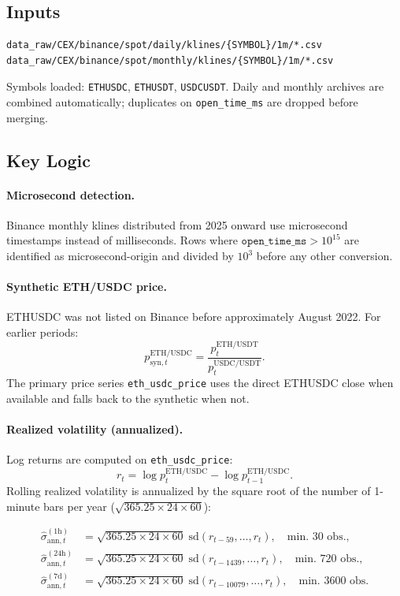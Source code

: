 \documentclass[11pt,a4paper]{article}
\begin{document}
\subsection{Inputs}

\begin{lstlisting}
data_raw/CEX/binance/spot/daily/klines/{SYMBOL}/1m/*.csv
data_raw/CEX/binance/spot/monthly/klines/{SYMBOL}/1m/*.csv
\end{lstlisting}

Symbols loaded: \texttt{ETHUSDC}, \texttt{ETHUSDT}, \texttt{USDCUSDT}.
Daily and monthly archives are combined automatically; duplicates on
\texttt{open\_time\_ms} are dropped before merging.

\subsection{Key Logic}

\paragraph{Microsecond detection.}
Binance monthly klines distributed from 2025 onward use microsecond
timestamps instead of milliseconds. Rows where
$\texttt{open\_time\_ms} > 10^{15}$ are identified as microsecond-origin
and divided by $10^{3}$ before any other conversion.

\paragraph{Synthetic ETH/USDC price.}
ETHUSDC was not listed on Binance before approximately August 2022.
For earlier periods:
\[
  p^{\mathrm{ETH/USDC}}_{\mathrm{syn},t}
  = \frac{p^{\mathrm{ETH/USDT}}_t}{p^{\mathrm{USDC/USDT}}_t}.
\]
The primary price series \texttt{eth\_usdc\_price} uses the direct
ETHUSDC close when available and falls back to the synthetic when not.

\paragraph{Realized volatility (annualized).}
Log returns are computed on \texttt{eth\_usdc\_price}:
\[
  r_t = \log p^{\mathrm{ETH/USDC}}_t - \log p^{\mathrm{ETH/USDC}}_{t-1}.
\]
Rolling realized volatility is annualized by the square root of the number
of 1-minute bars per year ($\sqrt{365.25 \times 24 \times 60}$):

\begin{align*}
  \hat{\sigma}^{(1\mathrm{h})}_{\mathrm{ann},t}  &=
    \sqrt{365.25 \times 24 \times 60}\;
    \mathrm{sd}(r_{t-59},\ldots,r_t),
    \quad \text{min.\ 30 obs.}, \\
  \hat{\sigma}^{(24\mathrm{h})}_{\mathrm{ann},t} &=
    \sqrt{365.25 \times 24 \times 60}\;
    \mathrm{sd}(r_{t-1439},\ldots,r_t),
    \quad \text{min.\ 720 obs.}, \\
  \hat{\sigma}^{(7\mathrm{d})}_{\mathrm{ann},t}  &=
    \sqrt{365.25 \times 24 \times 60}\;
    \mathrm{sd}(r_{t-10079},\ldots,r_t),
    \quad \text{min.\ 3600 obs.}
\end{align*}
\end{document}
